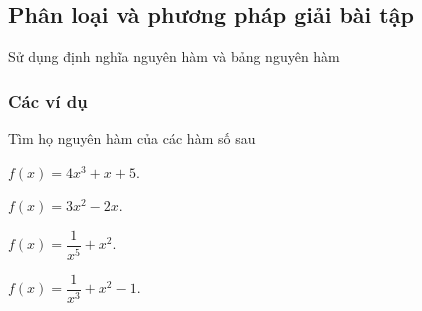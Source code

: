 \subsection{Phân loại và phương pháp giải bài tập}
\begin{dang}{Sử dụng định nghĩa nguyên hàm và bảng nguyên hàm}
\end{dang}
\subsubsection{Các ví dụ}
\begin{vd}%
	Tìm họ nguyên hàm của các hàm số sau
    \begin{listEX}[1]
        \item $f(x)=4x^3+x+5$.
        \item $f(x)=3x^2-2x$.
        \item $f(x)=\dfrac{1}{x^5}+x^2$.
        \item $f(x)=\dfrac{1}{x^3}+x^2-1$.
    \end{listEX}
    \end{vd}
